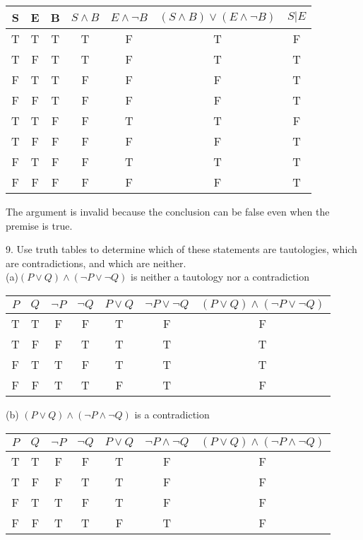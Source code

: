 \documentclass{article}
\begin{document}
 \linebreak
 \begin{tabular}{c|c|c|c|c|c|c}
 S&E&B&$S \wedge B$&$E \wedge \neg B$&$(S \wedge B) \vee (E \wedge \neg B)$&$S | E$\\
 \hline
 T&T&T&T&F&T&F\\
 T&F&T&T&F&T&T\\
 F&T&T&F&F&F&T\\
 F&F&T&F&F&F&T\\
 T&T&F&F&T&T&F\\
 T&F&F&F&F&F&T\\
 F&T&F&F&T&T&T\\
 F&F&F&F&F&F&T\\
 \end{tabular}
  \vspace{2em}
 \linebreak
 The argument is invalid because the conclusion can be false even when the premise is true.\\
 \newline
 
9. Use truth tables to determine which of these statements are tautologies, which are contradictions, and which are neither.\\
\newline
(a)$(P \vee Q)\wedge (\neg P \vee \neg Q)$ is neither a tautology nor a contradiction\\
\begin{tabular}{c|c|c|c|c|c|c}
$P$&$Q$&$\neg P$&$\neg Q$&$P \vee Q$&$\neg P \vee \neg Q$&$(P \vee Q)\wedge (\neg P \vee \neg Q)$\\
\hline
T&T&F&F&T&F&F\\
T&F&F&T&T&T&T\\
F&T&T&F&T&T&T\\
F&F&T&T&F&T&F\\
\end{tabular} 
\vspace{2em}
 \linebreak
 
 (b) $(P \vee Q)\wedge (\neg P \wedge \neg Q)$ is a contradiction\\
 \begin{tabular}{c|c|c|c|c|c|c}
 $P$&$Q$&$\neg P$&$\neg Q$&$P \vee Q$&$\neg P \wedge \neg Q$&$(P \vee Q)\wedge (\neg P \wedge \neg Q)$\\
 \hline
 T&T&F&F&T&F&F\\
 T&F&F&T&T&F&F\\
 F&T&T&F&T&F&F\\
 F&F&T&T&F&T&F\\
 \end{tabular}
 \vspace{2em}
 \linebreak
 
\end{document}
